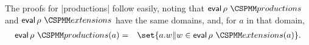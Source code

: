 The proofs for |productions| follow easily, noting that $\eval \rho~
\M{productions}$ and $\eval \rho~\M{extensions}$ have the same domains, and,
for $a$ in that domain,
\begin{eqnarray*}
\eval \rho~ \M{productions}(a) & = & 
  \set{ a.w \| w \in \eval \rho ~ \M{extensions}(a)}.
\end{eqnarray*}
%






%




